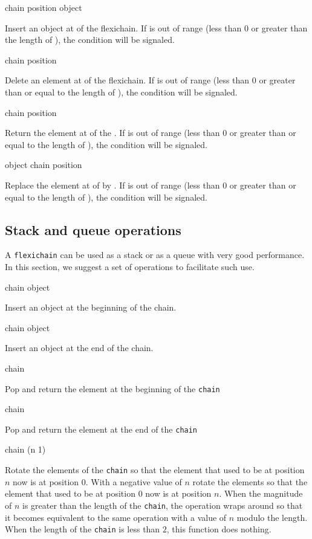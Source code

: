\documentclass[11pt]{article}
\begin{document}
 {chain position object}

Insert an object at  of the flexichain.  If
 is out of range (less than $0$ or greater than the
length of ), the  condition will be
signaled.

 {chain position}

Delete an element at  of the flexichain.  If
 is out of range (less than $0$ or greater than or equal
to the length of ), the  condition will be
signaled.

 {chain position}

Return the element at  of the .  If
 is out of range (less than $0$ or greater than or equal
to the length of ), the  condition will be
signaled.

 {object chain position}

Replace the element at  of  by .
If  is out of range (less than $0$ or greater than or
equal to the length of ), the  condition
will be signaled.

\subsection{Stack and queue operations}

A \texttt{flexichain} can be used as a stack or as a queue with very good
performance.  In this section, we suggest a set of operations to
facilitate such use. 

 {chain object}

Insert an object at the beginning of the chain.

 {chain object}

Insert an object at the end of the chain.

 {chain}

Pop and return the element at the beginning of the \texttt{chain}

 {chain}

Pop and return the element at the end of the \texttt{chain}

 {chain \optional (n 1)}

Rotate the elements of the \texttt{chain} so that the element that used
to be at position $n$ now is at position $0$.  With a negative value
of $n$ rotate the elements so that the element that used to be at
position $0$ now is at position $n$.  When the magnitude of $n$ is
greater than the length of the \texttt{chain}, the operation wraps
around so that it becomes equivalent to the same operation with a
value of $n$ modulo the length.  When the length of the \texttt{chain}
is less than $2$, this function does nothing. 
\end{document}
